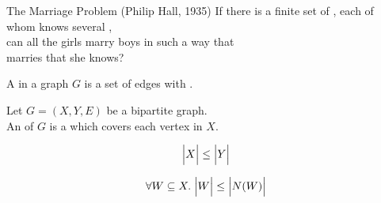 
\begin{frame}
\end{frame}

\begin{frame}{}
  \begin{exampleblock}{The Marriage Problem (Philip Hall, 1935)}
    If there is a finite set of ,
    each of whom knows several , \\[3pt]
     can all the girls marry boys in such a way that \\[3pt]
     marries  that she knows?
  \end{exampleblock}

  \pause
  \begin{center}
  \end{center}
\end{frame}

\begin{frame}{}

  \pause
  \vspace{0.30cm}
  \begin{definition}[Matching (匹配)]
    A  in a graph $G$ is a set of edges with .
  \end{definition}
\end{frame}

\begin{frame}{}

  \vspace{0.30cm}
  \begin{definition}
    {\small Let $G = (X, Y, E)$ be a bipartite graph. \\[3pt]
    An  of $G$ is a 
    which covers each vertex in $X$.}
  \end{definition}
\end{frame}

\begin{frame}{}
  \[
    \Big\lvert X \Big\rvert \le \Big\lvert Y \Big\rvert
  \]

  \pause
  \[
    \forall W \subseteq X.\; \Big\lvert W \Big\rvert \le \Big\lvert N(W) \Big\rvert
  \]
\end{frame}

